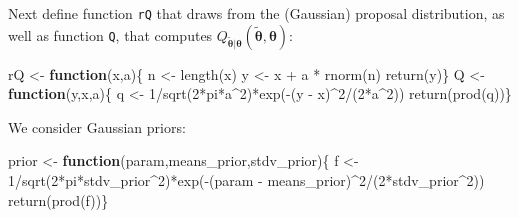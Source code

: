 \documentclass[
  12pt,
]{book}
\newenvironment{Shaded}{\begin{snugshade}}{\end{snugshade}}
\newcommand{\ControlFlowTok}[1]{\textcolor[rgb]{0.13,0.29,0.53}{\textbf{#1}}}
\newcommand{\DecValTok}[1]{\textcolor[rgb]{0.00,0.00,0.81}{#1}}
\newcommand{\FunctionTok}[1]{\textcolor[rgb]{0.00,0.00,0.00}{#1}}
\newcommand{\NormalTok}[1]{#1}
\newcommand{\OtherTok}[1]{\textcolor[rgb]{0.56,0.35,0.01}{#1}}
\newcommand{\SpecialCharTok}[1]{\textcolor[rgb]{0.00,0.00,0.00}{#1}}
\theoremstyle{definition}
\theoremstyle{definition}
\theoremstyle{definition}
\theoremstyle{definition}
\theoremstyle{remark}
\begin{document}
Next define function \texttt{rQ} that draws from the (Gaussian) proposal distribution, as well as function \texttt{Q}, that computes \(Q_{\tilde{\boldsymbol\theta}|{\boldsymbol\theta}}(\tilde{\boldsymbol\theta},{\boldsymbol\theta})\):

\begin{Shaded}
\begin{Highlighting}[]
\NormalTok{rQ }\OtherTok{\textless{}{-}} \ControlFlowTok{function}\NormalTok{(x,a)\{}
\NormalTok{  n }\OtherTok{\textless{}{-}} \FunctionTok{length}\NormalTok{(x)}
\NormalTok{  y }\OtherTok{\textless{}{-}}\NormalTok{ x }\SpecialCharTok{+}\NormalTok{ a }\SpecialCharTok{*} \FunctionTok{rnorm}\NormalTok{(n)}
  \FunctionTok{return}\NormalTok{(y)\}}
\NormalTok{Q }\OtherTok{\textless{}{-}} \ControlFlowTok{function}\NormalTok{(y,x,a)\{}
\NormalTok{  q }\OtherTok{\textless{}{-}} \DecValTok{1}\SpecialCharTok{/}\FunctionTok{sqrt}\NormalTok{(}\DecValTok{2}\SpecialCharTok{*}\NormalTok{pi}\SpecialCharTok{*}\NormalTok{a}\SpecialCharTok{\^{}}\DecValTok{2}\NormalTok{)}\SpecialCharTok{*}\FunctionTok{exp}\NormalTok{(}\SpecialCharTok{{-}}\NormalTok{(y }\SpecialCharTok{{-}}\NormalTok{ x)}\SpecialCharTok{\^{}}\DecValTok{2}\SpecialCharTok{/}\NormalTok{(}\DecValTok{2}\SpecialCharTok{*}\NormalTok{a}\SpecialCharTok{\^{}}\DecValTok{2}\NormalTok{))}
  \FunctionTok{return}\NormalTok{(}\FunctionTok{prod}\NormalTok{(q))\}}
\end{Highlighting}
\end{Shaded}

We consider Gaussian priors:

\begin{Shaded}
\begin{Highlighting}[]
\NormalTok{prior }\OtherTok{\textless{}{-}} \ControlFlowTok{function}\NormalTok{(param,means\_prior,stdv\_prior)\{}
\NormalTok{  f }\OtherTok{\textless{}{-}} \DecValTok{1}\SpecialCharTok{/}\FunctionTok{sqrt}\NormalTok{(}\DecValTok{2}\SpecialCharTok{*}\NormalTok{pi}\SpecialCharTok{*}\NormalTok{stdv\_prior}\SpecialCharTok{\^{}}\DecValTok{2}\NormalTok{)}\SpecialCharTok{*}\FunctionTok{exp}\NormalTok{(}\SpecialCharTok{{-}}\NormalTok{(param }\SpecialCharTok{{-}} 
\NormalTok{                                         means\_prior)}\SpecialCharTok{\^{}}\DecValTok{2}\SpecialCharTok{/}\NormalTok{(}\DecValTok{2}\SpecialCharTok{*}\NormalTok{stdv\_prior}\SpecialCharTok{\^{}}\DecValTok{2}\NormalTok{))}
  \FunctionTok{return}\NormalTok{(}\FunctionTok{prod}\NormalTok{(f))\}}
\end{Highlighting}
\end{Shaded}
\end{document}
